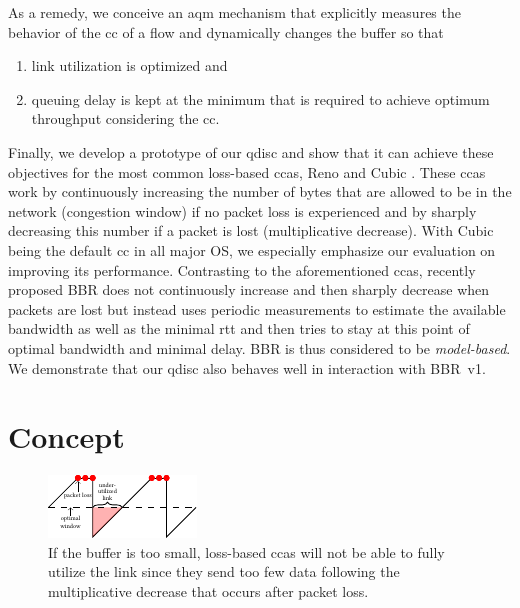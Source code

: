\documentclass[10pt,sigconf,letterpaper,dvipsnames\ifx\removeHeaders\tempYes ,nonacm\fi]{acmart}
\begin{document}
As a remedy, we conceive an \gls{aqm} mechanism that explicitly measures the behavior of the \gls{cc} of a flow and dynamically changes the buffer so that 
\begin{enumerate}[topsep=0pt,wide,labelwidth=!,labelindent=0pt]
\item link utilization is optimized and
\item queuing delay is kept at the minimum that is required to achieve optimum throughput considering the \gls{cc}.
\end{enumerate}
Finally, we develop a prototype of our \gls{qdisc} and show that it can achieve these objectives for the most common loss-based \glspl{cca}, Reno \cite {jacobson_congestion_1988} and Cubic \cite{ha_cubic:_2008}. These \glspl{cca} work by continuously increasing the number of bytes that are allowed to be in the network (congestion window) if no packet loss is experienced and by sharply decreasing this number if a packet is lost (multiplicative decrease). With Cubic being the default \gls{cc} in all major OS, we especially emphasize our evaluation on improving its performance. Contrasting to the aforementioned \glspl{cca}, recently proposed BBR \cite{cardwell_bbr:_2016} does not continuously increase and then sharply decrease when packets are lost but instead uses periodic measurements to estimate the available bandwidth as well as the minimal \gls{rtt} and then tries to stay at this point of optimal bandwidth and minimal delay. BBR is thus considered to be \textit{model-based}. We demonstrate that our \gls{qdisc} also behaves well in interaction with BBR~v1.

\section{Concept}

\begin{figure}[h]
\includegraphics[width=\columnwidth]{figures/traq_illustration_too_little.pdf}
\caption{If the buffer is too small, loss-based \glspl{cca} will not be able to fully utilize the link since they send too few data following the multiplicative decrease that occurs after packet loss.}
\label{fig:tooLittle}
\end{figure}
\end{document}
